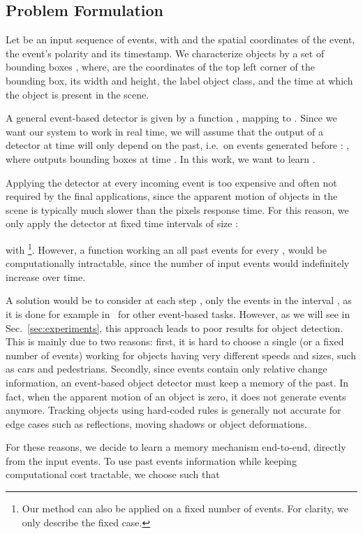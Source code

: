 \documentclass{article}
\begin{document}
\subsection{Problem Formulation}
\label{subsec:formulation}
Let  be an input sequence of events, with 
 and  the spatial coordinates of the event, 
 the event's polarity and  its timestamp. 
We characterize objects by a set of bounding boxes 
,
where,  are the coordinates of the top left corner of the bounding box,
 its width and height,  the label object class, 
and  the time at which the object 
is present in the scene. 

A general event-based detector is given by a function , mapping  to 
.
Since we want our system to work in real time, we will assume that the output of a detector 
at time  will only depend on the past, i.e.\ on events generated before : 
,
where  outputs 
bounding boxes at time . In this work, we want to learn .
    
Applying the detector  at every incoming event is too expensive and often not required by the final 
applications, since the apparent motion of objects in the scene is typically much slower than the pixels response time. 
For this reason, we only apply the detector at fixed time intervals of size :

with \footnote{
Our method can also be applied on a fixed number of events.
For clarity, we only describe the fixed  case.
}.
However, a function  working an all past events  for every , 
would be computationally intractable, since the number of input events would indefinitely increase over time. 

A solution would be to consider at each step , only the events in the interval 
, as it is done for example in~\cite{zhu2018ev,maqueda2018event} for other event-based tasks. However, as we will see in Sec.~\ref{sec:experiments}, this approach leads to poor results for object detection.
This is mainly due to two reasons: first, it is hard to choose a single  (or a fixed number of events) working for objects having very different speeds and sizes, such as cars and pedestrians. Secondly, since events contain only relative change information, 
an event-based object detector must keep a memory of the past. 
In fact, when the apparent motion of an object is zero, it does not generate events anymore. 
Tracking objects using hard-coded rules is generally not accurate for edge cases such as reflections, moving shadows or object deformations. 

For these reasons, we decide to learn a memory mechanism  end-to-end, directly from the input events.
To use past events information while keeping computational cost tractable, 
we choose  such that 
\end{document}
